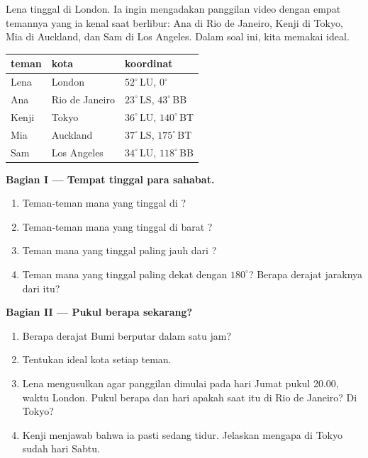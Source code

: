 \begin{problem}
\label{pb:g6:latitude-longitude:1}
Lena tinggal di London. Ia ingin mengadakan panggilan video dengan empat
temannya yang ia kenal saat berlibur: Ana di Rio de Janeiro, Kenji di Tokyo,
Mia di Auckland, dan Sam di Los Angeles. Dalam soal ini, kita memakai  ideal.

\begin{center}
\small
\begin{tabular}{lll}
\hline
teman & kota & koordinat\\
\hline
Lena & London & $52^\circ$\,LU, $0^\circ$\\
Ana & Rio de Janeiro & $23^\circ$\,LS, $43^\circ$\,BB\\
Kenji & Tokyo & $36^\circ$\,LU, $140^\circ$\,BT\\
Mia & Auckland & $37^\circ$\,LS, $175^\circ$\,BT\\
Sam & Los Angeles & $34^\circ$\,LU, $118^\circ$\,BB\\
\hline
\end{tabular}
\end{center}

\medskip
\noindent\textbf{Bagian I --- Tempat tinggal para sahabat.}
\begin{enumerate}
  \item Teman-teman mana yang tinggal di ?
  \item Teman-teman mana yang tinggal di barat ?
  \item Teman mana yang tinggal paling jauh dari ?
  \item Teman mana yang tinggal paling dekat dengan  $180^\circ$?
        Berapa derajat  jaraknya dari  itu?
\end{enumerate}

\medskip
\noindent\textbf{Bagian II --- Pukul berapa sekarang?}
\begin{enumerate}[resume]
  \item Berapa derajat Bumi berputar dalam satu jam?
  \item Tentukan  ideal kota setiap teman.
  \item Lena mengusulkan agar panggilan dimulai pada hari Jumat pukul 20.00,
        waktu London. Pukul berapa dan hari apakah saat itu di Rio de
        Janeiro? Di Tokyo?
  \item Kenji menjawab bahwa ia pasti sedang tidur. Jelaskan mengapa di
        Tokyo sudah hari Sabtu.
\end{enumerate}


\end{problem}
